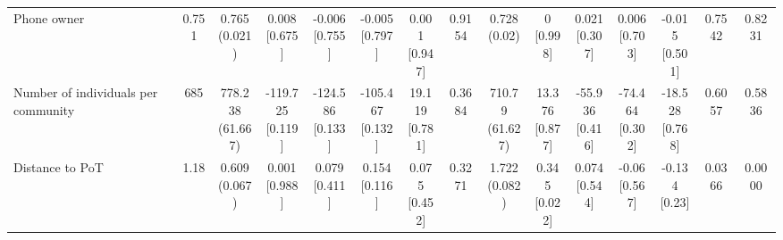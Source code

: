 {\begin{tabular}[t]{lcccccccccccccc}
\hspace{1em}Phone owner & 0.751 & \makecell[c]{0.765\\(0.021)} & \makecell[c]{0.008\\{[0.675]}} & \makecell[c]{-0.006\\{[0.755]}} & \makecell[c]{-0.005\\{[0.797]}} & \makecell[c]{0.001\\{[0.947]}} & 0.9154 & \makecell[c]{0.728\\(0.02)} & \makecell[c]{0\\{[0.998]}} & \makecell[c]{0.021\\{[0.307]}} & \makecell[c]{0.006\\{[0.703]}} & \makecell[c]{-0.015\\{[0.501]}} & 0.7542 & 0.8231\\
\hspace{1em}Number of individuals per community & 685 & \makecell[c]{778.238\\(61.667)} & \makecell[c]{-119.725\\{[0.119]}} & \makecell[c]{-124.586\\{[0.133]}} & \makecell[c]{-105.467\\{[0.132]}} & \makecell[c]{19.119\\{[0.781]}} & 0.3684 & \makecell[c]{710.79\\(61.627)} & \makecell[c]{13.376\\{[0.877]}} & \makecell[c]{-55.936\\{[0.416]}} & \makecell[c]{-74.464\\{[0.302]}} & \makecell[c]{-18.528\\{[0.768]}} & 0.6057 & 0.5836\\
\hspace{1em}Distance to PoT & 1.18 & \makecell[c]{0.609\\(0.067)} & \makecell[c]{0.001\\{[0.988]}} & \makecell[c]{0.079\\{[0.411]}} & \makecell[c]{0.154\\{[0.116]}} & \makecell[c]{0.075\\{[0.452]}} & 0.3271 & \makecell[c]{1.722\\(0.082)} & \makecell[c]{0.345\\{[0.022]}} & \makecell[c]{0.074\\{[0.544]}} & \makecell[c]{-0.06\\{[0.567]}} & \makecell[c]{-0.134\\{[0.23]}} & 0.0366 & 0.0000\\

\end{tabular}}
